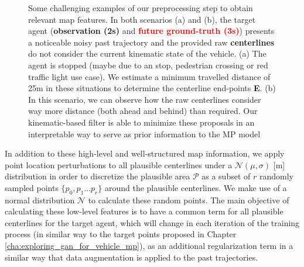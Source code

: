 \begin{figure}[t!]
	\begin{subfigure}{0.5\textwidth}
		\caption{}
	\end{subfigure}
	\hfill
	\begin{subfigure}{0.5\textwidth}
		\caption{}
	\end{subfigure}
	
	\captionsetup{justification=justified}
	\caption[Some challenging examples of our preprocessing step to obtain relevant map features]{Some challenging examples of our preprocessing step to obtain relevant map features. In both scenarios (a) and (b), the target agent (\textbf{\textcolor{YellowOrange}{observation (2s)}} and \textbf{\textcolor{red}{future ground-truth (3s)}}) presents a noticeable noisy past trajectory and the provided raw \textbf{centerlines} do not consider the current kinematic state of the vehicle. (a) The agent is stopped (maybe due to an stop, pedestrian crossing or red traffic light use case). We estimate a minimum travelled distance of 25m in these situations to determine the centerline end-points \textbf{E}. (b) In this scenario, we can observe how the raw centerlines consider way more distance (both ahead and behind) than required. Our kinematic-based filter is able to minimize these proposals in an interpretable way to serve as prior information to the MP model
	}
	\label{fig:chapter_6_Efficient_Baselines/efficient_baselines_hdmap_filtered_examples}
\end{figure}

In addition to these high-level and well-structured map information, we apply point location perturbations to all plausible centerlines under a $\mathcal{N}(\mu, \sigma)$ [m] distribution \cite{ye2021tpcn} in order to discretize the plausible area $\mathcal{P}$ as a subset of $r$ randomly sampled points $\{p_0 , p_1 ... p_r\}$ around the plausible centerlines. We make use of a normal distribution $\mathcal{N}$ to calculate these random points. The main objective of calculating these low-level features is to have a common term for all plausible centerlines for the target agent, which will change in each iteration of the training process (in similar way to the target points proposed in Chapter \ref{cha:exploring_gan_for_vehicle_mp}), as an additional regularization term in a similar way that data augmentation is applied to the past trajectories.

